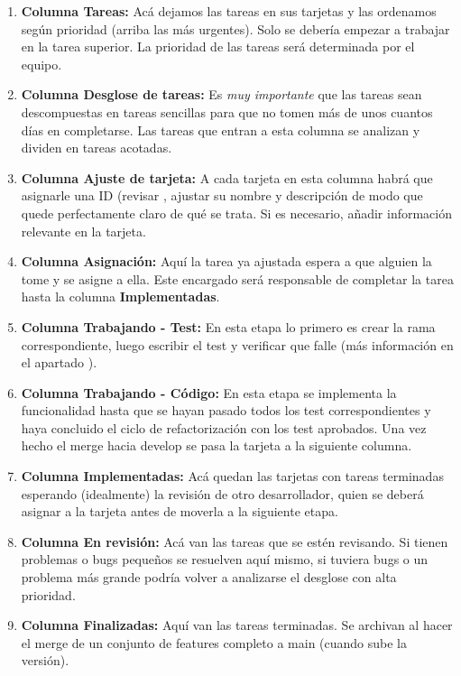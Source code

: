 \begin{enumerate}
	\item \textbf{Columna Tareas:} Acá dejamos las tareas en sus tarjetas y las ordenamos según prioridad (arriba las más urgentes). Solo se debería empezar a trabajar en la tarea superior. La prioridad de las tareas será determinada por el equipo.
	
	\item \textbf{Columna Desglose de tareas:} Es \textit{muy importante} que las tareas sean descompuestas en tareas sencillas para que no tomen más de unos cuantos días en completarse. Las tareas que entran a esta columna se analizan y dividen en tareas acotadas.
	
	\item \textbf{Columna Ajuste de tarjeta:} A cada tarjeta en esta columna habrá que asignarle una ID (revisar , ajustar su nombre y descripción de modo que quede perfectamente claro de qué se trata. Si es necesario, añadir información relevante en la tarjeta.

	\item \textbf{Columna Asignación:} Aquí la tarea ya ajustada espera a que alguien la tome y se asigne a ella. Este encargado será responsable de completar la tarea hasta la columna \textbf{Implementadas}.
	
	\item \textbf{Columna Trabajando - Test:} En esta etapa lo primero es crear la rama correspondiente, luego escribir el test y verificar que falle (más información en el apartado ).
	
	\item \textbf{Columna Trabajando - Código:} En esta etapa se implementa la funcionalidad hasta que se hayan pasado todos los test correspondientes y haya concluido el ciclo de refactorización con los test aprobados. Una vez hecho el merge hacia develop se pasa la tarjeta a la siguiente columna.
	
	\item \textbf{Columna Implementadas:} Acá quedan las tarjetas con tareas terminadas esperando (idealmente) la revisión de otro desarrollador, quien se deberá asignar a la tarjeta antes de moverla a la siguiente etapa.
	
	\item \textbf{Columna En revisión:} Acá van las tareas que se estén revisando. Si tienen problemas o bugs pequeños se resuelven aquí mismo, si tuviera bugs o un problema más grande podría volver a analizarse el desglose con alta prioridad.
	
	\item \textbf{Columna Finalizadas:} Aquí van las tareas terminadas. Se archivan al hacer el merge de un conjunto de features completo a main (cuando sube la versión).
\end{enumerate}

